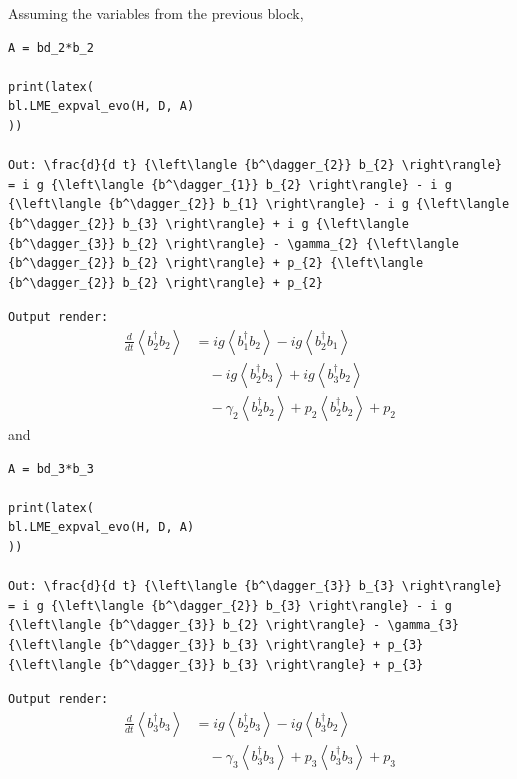 \documentclass[5p, twocolumn, 10pt, sort&compress]{elsarticle}
\newcommand{\inlinecode}[1]{\texttt{#1}}
\newenvironment{revision2}{%
\color{red}
}
{}
\begin{document}
\noindent \noindent Assuming the variables from the previous block,
\begin{verbatim}
A = bd_2*b_2

print(latex(
bl.LME_expval_evo(H, D, A)
))

Out: \frac{d}{d t} {\left\langle {b^\dagger_{2}} b_{2} \right\rangle} = i g {\left\langle {b^\dagger_{1}} b_{2} \right\rangle} - i g {\left\langle {b^\dagger_{2}} b_{1} \right\rangle} - i g {\left\langle {b^\dagger_{2}} b_{3} \right\rangle} + i g {\left\langle {b^\dagger_{3}} b_{2} \right\rangle} - \gamma_{2} {\left\langle {b^\dagger_{2}} b_{2} \right\rangle} + p_{2} {\left\langle {b^\dagger_{2}} b_{2} \right\rangle} + p_{2}
\end{verbatim}
\begin{revision2}
\noindent\inlinecode{Output render:}
\begin{align*}
\frac{d}{d t} {\left\langle {b^\dagger_{2}} b_{2} \right\rangle} &= i g {\left\langle {b^\dagger_{1}} b_{2} \right\rangle} - i g {\left\langle {b^\dagger_{2}} b_{1} \right\rangle} \\ &\quad - i g {\left\langle {b^\dagger_{2}} b_{3} \right\rangle} + i g {\left\langle {b^\dagger_{3}} b_{2} \right\rangle} 
\\&\quad - \gamma_{2} {\left\langle {b^\dagger_{2}} b_{2} \right\rangle} + p_{2} {\left\langle {b^\dagger_{2}} b_{2} \right\rangle} + p_{2}
\end{align*}
\end{revision2}
\noindent and
\begin{verbatim}
A = bd_3*b_3

print(latex(
bl.LME_expval_evo(H, D, A)
))

Out: \frac{d}{d t} {\left\langle {b^\dagger_{3}} b_{3} \right\rangle} = i g {\left\langle {b^\dagger_{2}} b_{3} \right\rangle} - i g {\left\langle {b^\dagger_{3}} b_{2} \right\rangle} - \gamma_{3} {\left\langle {b^\dagger_{3}} b_{3} \right\rangle} + p_{3} {\left\langle {b^\dagger_{3}} b_{3} \right\rangle} + p_{3}
\end{verbatim}
\begin{revision2}
\noindent\inlinecode{Output render:}
\begin{align*}
\frac{d}{d t} {\left\langle {b^\dagger_{3}} b_{3} \right\rangle} &= i g {\left\langle {b^\dagger_{2}} b_{3} \right\rangle} - i g {\left\langle {b^\dagger_{3}} b_{2} \right\rangle} 
\\&\quad - \gamma_{3} {\left\langle {b^\dagger_{3}} b_{3} \right\rangle} + p_{3} {\left\langle {b^\dagger_{3}} b_{3} \right\rangle} + p_{3}
\end{align*}
\end{revision2}
\end{document}
